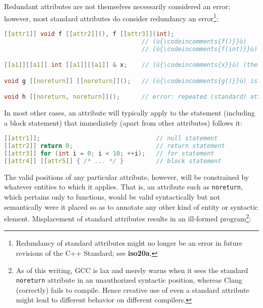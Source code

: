 \noindent Redundant attributes are not themselves necessarily considered an error;
however, most standard attributes do consider redundancy an
error{\cprotect\footnote{Redundancy of standard
attributes might no longer be an error in future revisions of the
  C++ Standard; see \textbf{{iso20a}}.}}:

\begin{lstlisting}[language=C++]
[[attr1]] void f [[attr2]](), f [[attr3]](int);
                                      // (ù{\codeincomments{f()}}ù)    is (ù{\codeincomments{attr1}}ù) and (ù{\codeincomments{attr2}}ù).
                                      // (ù{\codeincomments{f(int)}}ù) is (ù{\codeincomments{attr1}}ù) and (ù{\codeincomments{attr3}}ù).

[[a1]][[a1]] int [[a1]][[a1]] & x;    // (ù{\codeincomments{x}}ù) (the reference itself) is (ù{\codeincomments{a1}}ù).

void g [[noreturn]] [[noreturn]]();   // (ù{\codeincomments{g()}}ù) is (ù{\codeincomments{noreturn}}ù).

void h [[noreturn, noreturn]]();      // error: repeated (standard) attribute
\end{lstlisting}

\noindent In most other cases, an attribute will typically apply to the statement
(including a block statement) that immediately (apart from other
attributes) follows it:

\begin{lstlisting}[language=C++]
[[attr1]];                                // null statement
[[attr2]] return 0;                       // return statement
[[attr3]] for (int i = 0; i < 10; ++i);   // for statement
[[attr4]] [[attr5]] { /* ... */ }         // block statement
\end{lstlisting}

\noindent The valid positions of any particular attribute, however, will be
constrained by whatever entities to which it applies. That is, an
attribute such as \texttt{noreturn}, which pertains only to functions,
would be valid syntactically but not semantically were it placed so as
to annotate any other kind of entity or syntactic element. Misplacement of
standard attributes results in an ill-formed
program{\cprotect\footnote{As of this writing, GCC is lax and merely
warns when it sees the standard \texttt{noreturn} attribute in an
unauthorized syntactic position, whereas Clang (correctly) fails to
compile. Hence creative use of even a standard attribute might
  lead to different behavior on different compilers.}}:

